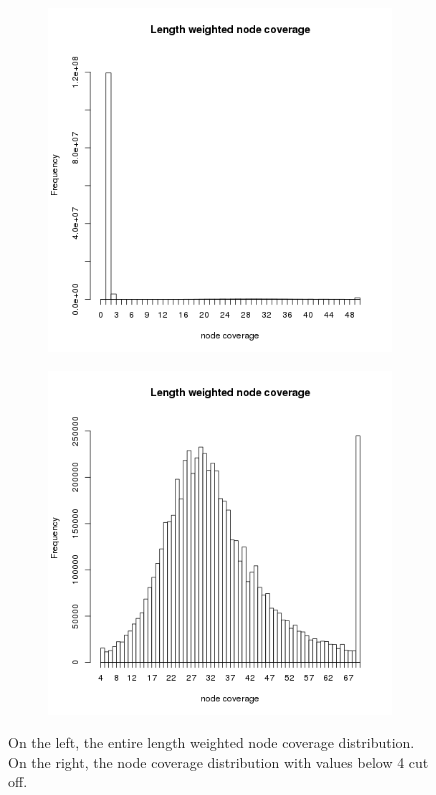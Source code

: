 \documentclass[a4paper,12pt]{article}
\begin{document}
\begin{figure}
\centering
\begin{subfigure}{.5\textwidth}
  \centering
  \includegraphics[width=1.\linewidth]{images/noparams_wcov}
  \caption{}
  \label{fig:cov_dist_all}
\end{subfigure}%
\begin{subfigure}{.5\textwidth}
  \centering
  \includegraphics[width=1.\linewidth]{images/noparams_wcov_cc}
  \caption{}
  \label{fig:cov_dist_cc}
\end{subfigure}
\caption{On the left, the entire length weighted node coverage distribution. On the right, the node coverage distribution with values below 4 cut off.}
\label{fig:cov_dist}
\end{figure}
\end{document}
